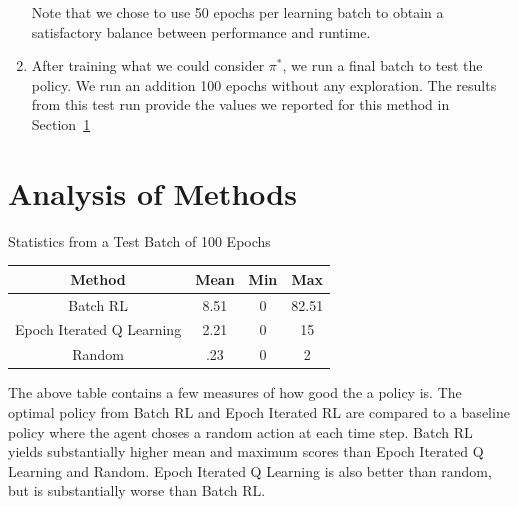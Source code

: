 \documentclass[11pt, oneside]{article}   	%
\begin{document}
\begin{enumerate}
 Note that we chose to use 50 epochs per learning batch to obtain a satisfactory balance between performance and runtime.

\item After training what we could consider $\pi^*$, we run a final batch to test the policy. We run an addition 100 epochs without any exploration. The results from this test run provide the values we reported for this method in Section~\ref{sec:analysis}
 
\end{enumerate}

\section{Analysis of Methods}
\label{sec:analysis}

  \begin{center}
    Statistics from a Test Batch of 100 Epochs\\
      \vspace{3mm}
    \begin{tabular}{ | c | c | c | c | } 
      \hline
      Method & Mean & Min & Max \\ 
      \hline
      Batch RL & 8.51 & 0 & 82.51 \\ 
      \hline
      Epoch Iterated Q Learning & 2.21 & 0 & 15 \\  
      \hline
      Random & .23 & 0 & 2 \\
      \hline
    \end{tabular}
  \end{center}
  \vspace{3mm}
  The above table contains a few measures of how good the a policy is.  The optimal policy from Batch RL and Epoch Iterated RL are compared to a baseline policy where the agent choses a random action at each time step.  Batch RL yields substantially higher mean and maximum scores than Epoch Iterated Q Learning and Random.  Epoch Iterated Q Learning is also better than random, but is substantially worse than Batch RL.  \\
  
\end{document}

